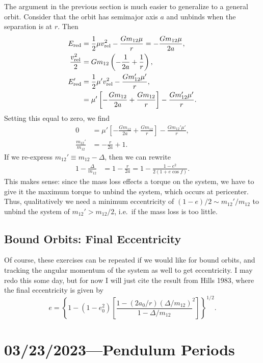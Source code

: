 \documentclass[12pt]{article}
\newcommand*{\p}[1]{\left(#1\right)}
\newcommand*{\s}[1]{\left[#1\right]}
\newcommand*{\z}[1]{\left\{#1\right\}}
\begin{document}
The argument in the previous section is much easier to generalize to a general
orbit. Consider that the orbit has semimajor axis $a$ and unbinds when the
separation is at $r$. Then
\begin{align*}
    E_{\rm red} &= \frac{1}{2}\mu v_{\rm rel}^2
        - \frac{Gm_{12}\mu}{r} = -\frac{Gm_{12}\mu}{2a},\\
    \frac{v_{\rm rel}^2}{2} &= Gm_{12}\p{-\frac{1}{2a} + \frac{1}{r}},\\
    E_{\rm red}' &= \frac{1}{2}\mu' v_{\rm rel}^2 - \frac{Gm_{12}'\mu'}{r},\\
        &= \mu'\s{-\frac{Gm_{12}}{2a} + \frac{Gm_{12}}{r}}
            - \frac{Gm_{12}'\mu'}{r}.
\end{align*}
Setting this equal to zero, we find
\begin{align}
    0 &= \mu'\s{-\frac{Gm_{12}}{2a} + \frac{Gm_{12}}{r}}
            - \frac{Gm_{12}'\mu'}{r},\\
    \frac{m_{12}'}{m_{12}} &= -\frac{r}{2a} + 1.
\end{align}
If we re-express $m_{12}' \equiv m_{12} - \Delta$, then we can rewrite
\begin{align}
    1 - \frac{\Delta}{m_{12}} &= 1 - \frac{r}{2a}
        = 1 - \frac{1 - e^2}{2\p{1 + e\cos f}}.
\end{align}
This makes sense: since the mass loss effects a torque on the system, we have to
give it the maximum torque to unbind the system, which occurs at pericenter.
Thus, qualitatively we need a minimum eccentricity of $(1 - e) / 2 \sim m_{12}'
/ m_{12}$ to unbind the system of $m_{12}' > m_{12} / 2$, i.e.\ if the mass loss
is too little.

\subsection{Bound Orbits: Final Eccentricity}

Of course, these exercises can be repeated if we would like for bound orbits,
and tracking the angular momentum of the system as well to get eccentricity.
I may redo this some day, but for now I will just cite the result from Hills
1983, where the final eccentricity is given by
\begin{equation}
    e = \z{1 - (1 - e_0^2)\s{\frac{1 - (2a_0/r)(\Delta / m_{12})}{
        1 - \Delta / m_{12}}^2}}^{1/2}.
\end{equation}

\section{03/23/2023---Pendulum Periods}
\end{document}
